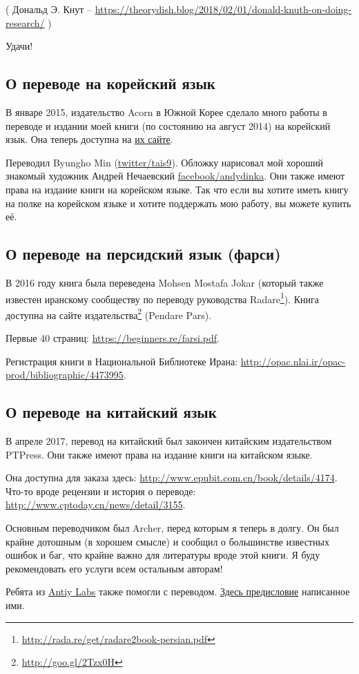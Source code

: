 
( Дональд Э. Кнут -- \url{https://theorydish.blog/2018/02/01/donald-knuth-on-doing-research/} )

Удачи!

\subsection*{О переводе на корейский язык}

В январе 2015, издательство Acorn в Южной Корее сделало много работы в переводе 
и издании моей книги (по состоянию на август 2014) на корейский язык.
Она теперь доступна на \href{http://go.yurichev.com/17343}{их сайте}.

Переводил Byungho Min (\href{http://go.yurichev.com/17344}{twitter/tais9}).
Обложку нарисовал мой хороший знакомый художник Андрей Нечаевский
\href{http://go.yurichev.com/17023}{facebook/andydinka}.
Они также имеют права на издание книги на корейском языке.
Так что если вы хотите иметь  книгу на полке на корейском языке и
хотите поддержать мою работу, вы можете купить её.

\subsection*{О переводе на персидский язык (фарси)}

В 2016 году книга была переведена Mohsen Mostafa Jokar (который также известен иранскому сообществу по переводу руководства Radare\footnote{\url{http://rada.re/get/radare2book-persian.pdf}}).
Книга доступна на сайте издательства\footnote{\url{http://goo.gl/2Tzx0H}} (Pendare Pars).

Первые 40 страниц: \url{https://beginners.re/farsi.pdf}.

Регистрация книги в Национальной Библиотеке Ирана: \url{http://opac.nlai.ir/opac-prod/bibliographic/4473995}.

\subsection*{О переводе на китайский язык}

В апреле 2017, перевод на китайский был закончен китайским издательством PTPress. Они также имеют права на издание книги на китайском языке.

Она доступна для заказа здесь: \url{http://www.epubit.com.cn/book/details/4174}. Что-то вроде рецензии и история о переводе: \url{http://www.cptoday.cn/news/detail/3155}.

Основным переводчиком был Archer, перед которым я теперь в долгу.
Он был крайне дотошным (в хорошем смысле) и сообщил о большинстве известных ошибок и баг, что крайне важно для литературы вроде этой книги.
Я буду рекомендовать его услуги всем остальным авторам!

Ребята из \href{http://www.antiy.net/}{Antiy Labs} также помогли с переводом. \href{http://www.epubit.com.cn/book/onlinechapter/51413}{Здесь предисловие} написанное ими.

